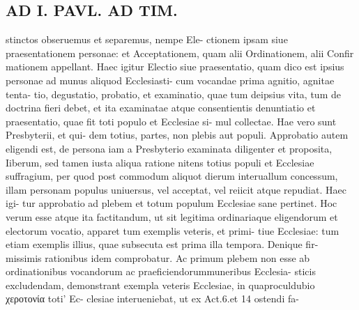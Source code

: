 \documentclass{article}
\begin{document}
\begin{pages}
\section*{AD I. PAVL. AD TIM. }stinctos obseruemus et separemus, nempe Ele- ctionem ipsam siue praesentationem personae: et Acceptationem, quam alii Ordinationem, alii Confir mationem appellant. Haec igitur Electio siue praesentatio, quam dico est ipsius personae ad munus aliquod Ecclesiasti- cum vocandae prima agnitio, agnitae tenta- tio, degustatio, probatio, et examinatio, quae tum deipsius vita, tum de doctrina fieri debet, et ita examinatae atque consentientis denuntiatio et praesentatio, quae fit toti populo et Ecclesiae si- mul collectae. Hae vero sunt Presbyterii, et qui- dem totius, partes, non plebis aut populi. Approbatio autem eligendi est, de persona iam a Presbyterio examinata diligenter et proposita, Iiberum, sed tamen iusta aliqua ratione nitens totius populi et Ecclesiae suffragium, per quod post commodum aliquot dierum interuallum concessum, illam personam populus uniuersus, vel acceptat, vel reiicit atque repudiat. Haec igi- tur approbatio ad plebem et totum populum Ecclesiae sane pertinet. Hoc verum esse atque ita factitandum, ut sit legitima ordinariaque eligendorum et electorum vocatio, apparet tum exemplis veteris, et primi- tiue Ecclesiae: tum etiam exemplis illius, quae subsecuta est prima illa tempora. Denique fir- missimis rationibus idem comprobatur. Ac primum plebem non esse ab ordinationibus vocandorum ac praeficiendorummuneribus Ecclesia- sticis excludendam, demonstrant exempla veteris Ecclesiae, in quaproculdubio χεροτονία toti' Ec- clesiae interueniebat, ut ex Act.6.et 14 ostendi fa- 

\end{pages}
\end{document}
